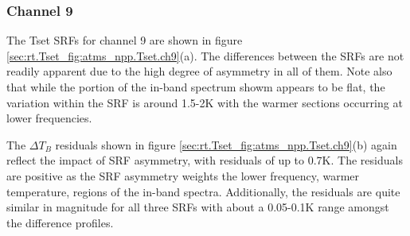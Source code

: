 \subsubsection{Channel 9}
The Tset SRFs for channel 9 are shown in figure \ref{sec:rt.Tset_fig:atms_npp.Tset.ch9}(a). The differences between the SRFs are not readily apparent due to the high degree of asymmetry in all of them. Note also that while the portion of the in-band spectrum showm appears to be flat, the variation within the SRF is around 1.5-2K with the warmer sections occurring at lower frequencies.

The $\Delta T_B$ residuals shown in figure \ref{sec:rt.Tset_fig:atms_npp.Tset.ch9}(b) again reflect the impact of SRF asymmetry, with residuals of up to 0.7K.  The residuals are positive as the SRF asymmetry weights the lower frequency, warmer temperature, regions of the in-band spectra. Additionally, the residuals are quite similar in magnitude for all three SRFs with about a 0.05-0.1K range amongst the difference profiles.
